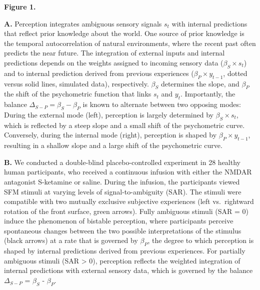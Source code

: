 \documentclass[
]{article}
\begin{document}
\textbf{Figure 1.}

\textbf{A.} Perception integrates ambiguous sensory signals \(s_t\) with
internal predictions that reflect prior knowledge about the world. One
source of prior knowledge is the temporal autocorrelation of natural
environments, where the recent past often predicts the near future. The
integration of external inputs and internal predictions depends on the
weights assigned to incoming sensory data (\(\beta_S \times s_t\)) and
to internal prediction derived from previous experiences
(\(\beta_P \times y_{t-1}\), dotted versus solid lines, simulated data),
respectively. \(\beta_S\) determines the slope, and \(\beta_P\) the
shift of the psychometric function that links \(s_t\) and \(y_t\).
Importantly, the balance \(\Delta_{S-P} = \beta_S - \beta_P\) is known
to alternate between two opposing modes: During the external mode
(left), perception is largely determined by \(\beta_S \times s_t\),
which is reflected by a steep slope and a small shift of the
psychometric curve. Conversely, during the internal mode (right),
perception is shaped by \(\beta_P \times y_{t-1}\), resulting in a
shallow slope and a large shift of the psychometric curve.

\textbf{B.} We conducted a double-blind placebo-controlled experiment in
28 healthy human participants, who received a continuous infusion with
either the NMDAR antagonist S-ketamine or saline. During the infusion,
the participants viewed SFM stimuli at varying levels of
signal-to-ambiguity (SAR). The stimuli were compatible with two mutually
exclusive subjective experiences (left vs.~rightward rotation of the
front surface, green arrows). Fully ambiguous stimuli (SAR = 0) induce
the phenomenon of bistable perception, where participants perceive
spontaneous changes between the two possible interpretations of the
stimulus (black arrows) at a rate that is governed by \(\beta_P\), the
degree to which perception is shaped by internal predictions derived
from previous experiences. For partially ambiguous stimuli (SAR
\textgreater{} 0), perception reflects the weighted integration of
internal predictions with external sensory data, which is governed by
the balance \(\Delta_{S-P}\) = \(\beta_S\) - \(\beta_P\).
\end{document}
